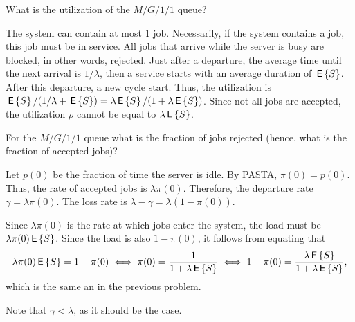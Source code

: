 \begin{question}
  What is the utilization of the $M/G/1/1$ queue?  
  \begin{solution}
 The system can contain at most 1 job. Necessarily, if the
      system contains a job, this job must be in service.  All jobs
      that arrive while the server is busy are blocked, in other
      words, rejected.  Just after a departure, the average time until
      the next arrival is $1/\lambda$, then a service starts with an
      average duration of $\,\mathsf{E}\left\{S\right\}$. After this departure, a new cycle
      start. Thus, the utilization is
      $\,\mathsf{E}\left\{S\right\}/(1/\lambda + \,\mathsf{E}\left\{S\right\}) = \lambda \,\mathsf{E}\left\{S\right\}/ (1 + \lambda \,\mathsf{E}\left\{S\right\})$.
      Since not all jobs are accepted, the utilization $\rho$ cannot
      be equal to $\lambda \,\mathsf{E}\left\{S\right\}$.
  \end{solution}
\end{question}

\begin{question}
  For the $M/G/1/1$ queue what is the fraction of jobs rejected
  (hence, what is the fraction of accepted jobs)?  
  \begin{solution}
    Let $p(0)$ be the fraction of time the server is idle. By PASTA,
    $\pi(0)=p(0)$. Thus, the rate of accepted jobs is
    $\lambda\pi(0)$. Therefore, the departure rate
    $\gamma=\lambda\pi(0)$. The loss rate is
    $\lambda-\gamma = \lambda (1-\pi(0))$.

    Since $\lambda\pi(0)$ is the rate at which jobs enter the system,
    the load must be $\lambda\pi(0)\,\mathsf{E}\left\{S\right\}$. Since the load is also
    $1-\pi(0)$, it follows from equating that
    \begin{equation*}
      \lambda\pi(0) \,\mathsf{E}\left\{S\right\} = 1 - \pi(0) \iff \pi(0)=\frac1{1+\lambda\,\mathsf{E}\left\{S\right\}} 
\iff 1-\pi(0) = \frac{\lambda \,\mathsf{E}\left\{S\right\}}{1+\lambda \,\mathsf{E}\left\{S\right\}},
    \end{equation*}
which is the same an in the previous problem.

Note that  $\gamma < \lambda$, as it should be the case. 
  \end{solution}
\end{question}


